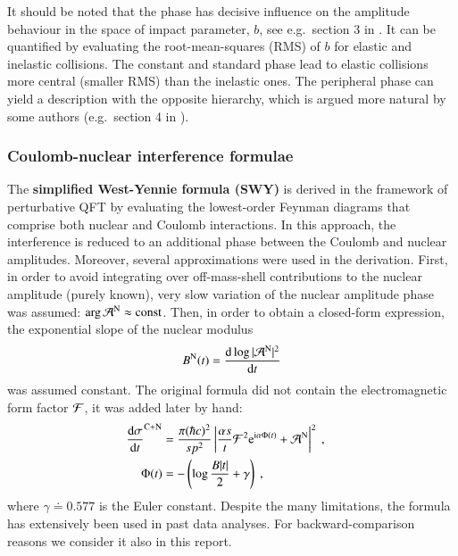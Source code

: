 It should be noted that the phase has decisive influence on the amplitude behaviour in the space of impact parameter, $b$, see e.g.~section 3 in \cite{klk02}. It can be quantified by evaluating the root-mean-squares (RMS) of $b$ for elastic and inelastic collisions. The constant and standard phase lead to elastic collisions more central (smaller RMS) than the inelastic ones. The peripheral phase can yield a description with the opposite hierarchy, which is argued more natural by some authors (e.g.~section 4 in \cite{kl96}).

\subsubsection{Coulomb-nuclear interference formulae}

The {\bf simplified West-Yennie formula (SWY)} \cite{wy68} is derived in the framework of perturbative QFT by evaluating the lowest-order Feynman diagrams that comprise both nuclear and Coulomb interactions. In this approach, the interference is reduced to an additional phase between the Coulomb and nuclear amplitudes. Moreover, several approximations were used in the derivation. First, in order to avoid integrating over off-mass-shell contributions to the nuclear amplitude (purely known), very slow variation of the nuclear amplitude phase was assumed: $\arg {\cal A}^{\rm N} \approx \hbox{const}$. Then, in order to obtain a closed-form expression, the exponential slope of the nuclear modulus
\begin{equation}
B^{\rm N}(t) = {\d \log |{\cal A}^{\rm N}|^2 \over \d t}
\end{equation}
was assumed constant. The original formula did not contain the electromagnetic form factor ${\cal F}$, it was added later by hand:
\begin{equation}
\label{eq:int swy}
	\begin{aligned}
		{\d\sigma\over \d t}^{\rm C+N} &= {\pi (\hbar c)^2 \over s p^2} \left | {\alpha s\over t} {\cal F}^2 \e^{\I\alpha \Phi(t)} + {\cal A}^{\rm N} \right |^2\ ,\cr
		\Phi(t) &= - \left( \log {B |t|\over 2} + \gamma \right)\ ,\cr
	\end{aligned}
\end{equation}
where $\gamma \doteq 0.577$ is the Euler constant. Despite the many limitations, the formula has extensively been used in past data analyses. For backward-comparison reasons we consider it also in this report.

